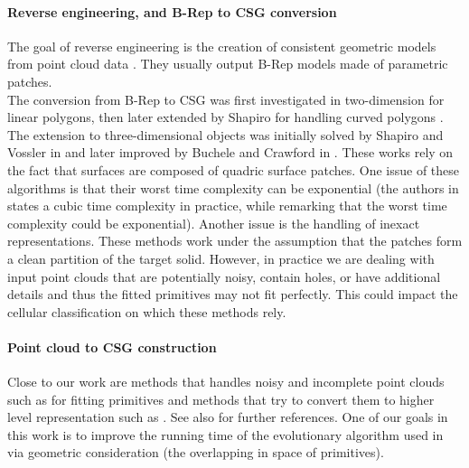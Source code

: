 \paragraph{Reverse engineering, and B-Rep to CSG conversion}
The goal of reverse engineering is the creation of consistent geometric models from point cloud data \cite{VMC97,BMV01}. They usually output B-Rep models 
made of parametric patches.
\\
The conversion from B-Rep to CSG was first investigated in 
two-dimension for linear polygons, then 
later extended by Shapiro for handling curved polygons \cite{shapiro1991efficient, shapiro2001convex}. 
The extension to three-dimensional objects was initially solved 
by Shapiro and Vossler in 
\cite{shapiro1991construction, shapiro1993separation} 
and later improved by 
Buchele and Crawford in \cite{buchele2004three}. 
These works rely on the fact that surfaces are composed of quadric surface patches. 
One issue of these algorithms is that their worst time complexity can be 
exponential (the authors in \cite{buchele2004three} states a cubic 
time complexity in practice, while remarking that the worst time complexity could be exponential). 
Another issue is the handling of inexact representations. 
These methods work under the assumption that the patches form a clean partition of the 
target solid. However, in practice we are dealing with input point clouds that are potentially 
noisy, contain holes, or have additional details and thus the fitted primitives may not fit perfectly. 
This could impact the cellular classification on which these methods rely. 

\paragraph{Point cloud to CSG construction}
Close to our work are methods that handles noisy and incomplete point clouds 
such as \cite{schnabel2007efficient} for fitting primitives and methods that try to convert them to higher level representation such as \cite{fayolle2016evolutionary}. See also \cite[Sections~7 and 8]{berger2017survey} for further references. 
One of our goals in this work is to improve the running time of the evolutionary algorithm used in \cite{fayolle2016evolutionary} via geometric consideration (the overlapping in space of primitives).

